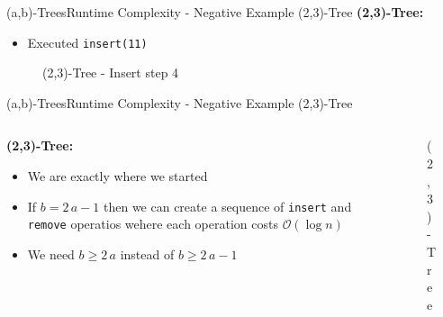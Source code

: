
\begin{frame}{(a,b)-Trees}{Runtime Complexity - Negative Example (2,3)-Tree}
  \textbf{(2,3)-Tree:}
  \begin{itemize}
    \item
      Executed \texttt{\color{Mittel-Blau}insert(11)}
  \end{itemize}
  \begin{figure}
    \begin{adjustbox}{width=0.6\linewidth}
      
    \end{adjustbox}
    \label{fig:a_b_tree:2_3_tree_9}
    \caption{(2,3)-Tree - Insert step 4}
  \end{figure}
\end{frame}


\begin{frame}{(a,b)-Trees}{Runtime Complexity - Negative Example (2,3)-Tree}
  \begin{columns}
    \begin{column}{0.6\linewidth}
      \textbf{(2,3)-Tree:}
      \begin{itemize}
        \item
          We are exactly where we started
        \item
          If {\color{Mittel-Blau}$b=2\,a-1$} then we can create a sequence of
          \texttt{\color{Mittel-Blau}insert} and
          \texttt{\color{Mittel-Blau}remove} operatios wehere each operation
          costs {\color{Mittel-Blau}$\mathcal{O}(\log n)$}
        \item
          We need {\color{Mittel-Blau}$b \geq 2 \, a$} instead of
          {\color{Mittel-Blau}$b \geq 2 \, a - 1$}
      \end{itemize}
    \end{column}
    \begin{column}{0.4\linewidth}
      \begin{figure}
        \begin{adjustbox}{width=\linewidth}
          
        \end{adjustbox}
        \vspace{-1.5em}
        \label{fig:a_b_tree:2_3_tree_10}
        \caption{(2,3)-Tree}
      \end{figure}
    \end{column}
  \end{columns}
\end{frame}

